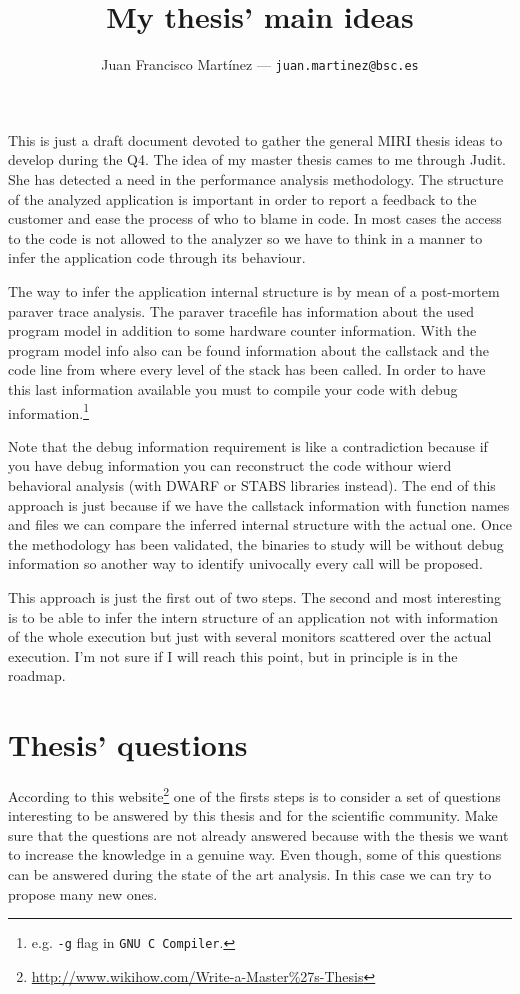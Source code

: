 \documentclass[draft]{article}
\title{
    My thesis' main ideas
}
\author{
    Juan Francisco Martínez ---
    \texttt{juan.martinez@bsc.es}
}
\begin{document}
\maketitle

This is just a draft document devoted to gather the general MIRI thesis ideas to develop during the Q4. The idea of my master thesis cames to me through Judit. She has detected a need in the performance analysis methodology. The structure of the analyzed application is important in order to report a feedback to the customer and ease the process of who to blame in code. In most cases the access to the code is not allowed to the analyzer so we have to think in a manner to infer the application code through its behaviour.

The way to infer the application internal structure is by mean of a post-mortem paraver trace analysis. The paraver tracefile has information about the used program model in addition to some hardware counter information. With the program model info also can be found information about the callstack and the code line from where every level of the stack has been called. In order to have this last information available you must to compile your code with debug information.\footnote{e.g. \texttt{-g} flag in \texttt{GNU C Compiler}.}

Note that the debug information requirement is like a contradiction because if you have debug information you can reconstruct the code withour wierd behavioral analysis (with DWARF or STABS libraries instead). The end of this approach is just because if we have the callstack information with function names and files we can compare the inferred internal structure with the actual one. Once the methodology has been validated, the binaries to study will be without debug information so another way to identify univocally every call will be proposed.

This approach is just the first out of two steps. The second and most interesting is to be able to infer the intern structure of an application not with information of the whole execution but just with several monitors scattered over the actual execution. I'm not sure if I will reach this point, but in principle is in the roadmap.

\section{Thesis' questions}

According to this website\footnote{\url{http://www.wikihow.com/Write-a-Master\%27s-Thesis}} one of the firsts steps is to consider a set of questions interesting to be answered by this thesis and for the scientific community. Make sure that the questions are not already answered because with the thesis we want to increase the knowledge in a genuine way. Even though, some of this questions can be answered during the state of the art analysis. In this case we can try to propose many new ones.
\end{document}
